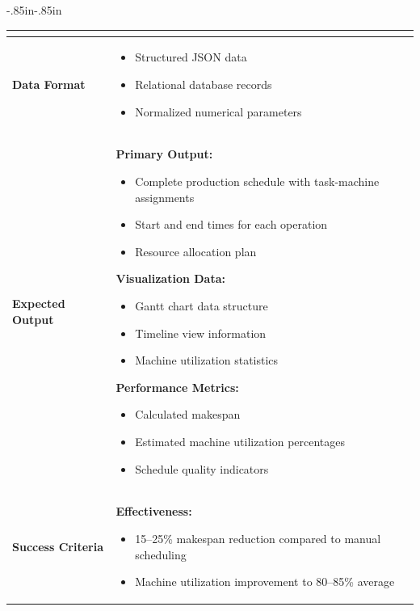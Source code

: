 \begin{table}[H]
\begin{adjustwidth}{-.85in}{-.85in}
\begin{tabularx}{1.3\textwidth}{|l|X|}
\begin{itemize}[nosep,leftmargin=*,topsep=2pt, partopsep=0pt, itemsep=1pt]
        \end{itemize} \\
        \hline
        \textbf{Data Format} &
        \begin{itemize}[nosep,leftmargin=*,topsep=2pt, partopsep=0pt, itemsep=1pt]
            \item Structured JSON data
            \item Relational database records
            \item Normalized numerical parameters
        \end{itemize} \\
        \hline
        \textbf{Expected Output} &
        \textbf{Primary Output:}
        \begin{itemize}[nosep,leftmargin=*,topsep=2pt, partopsep=0pt, itemsep=1pt]
            \item Complete production schedule with task-machine assignments
            \item Start and end times for each operation
            \item Resource allocation plan
        \end{itemize}
        \textbf{Visualization Data:}
        \begin{itemize}[nosep,leftmargin=*,topsep=2pt, partopsep=0pt, itemsep=1pt]
            \item Gantt chart data structure
            \item Timeline view information
            \item Machine utilization statistics
        \end{itemize}
        \textbf{Performance Metrics:}
        \begin{itemize}[nosep,leftmargin=*,topsep=2pt, partopsep=0pt, itemsep=1pt]
            \item Calculated makespan
            \item Estimated machine utilization percentages
            \item Schedule quality indicators
        \end{itemize} \\
        \hline
        \textbf{Success Criteria} &
        \textbf{Effectiveness:}
        \begin{itemize}[nosep,leftmargin=*,topsep=2pt, partopsep=0pt, itemsep=1pt]
            \item 15--25\% makespan reduction compared to manual scheduling
            \item Machine utilization improvement to 80--85\% average

\end{itemize}
\end{tabularx}
\end{adjustwidth}
\end{table}
